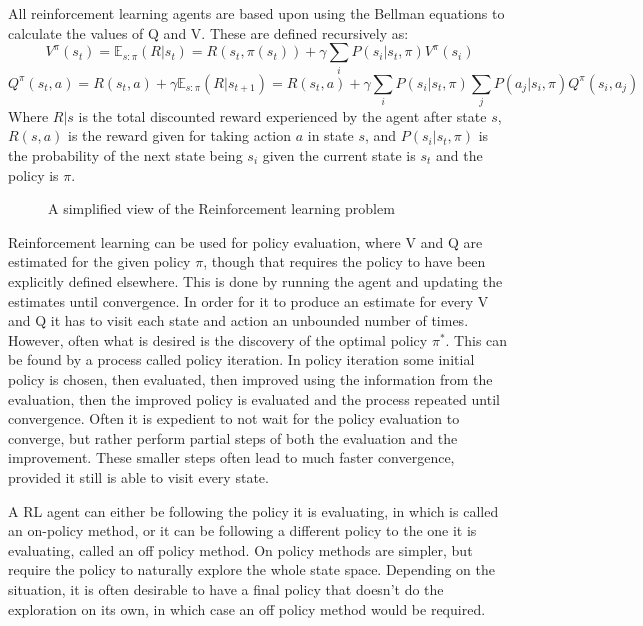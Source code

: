 All reinforcement learning agents are based upon using the Bellman equations to calculate the values of Q and V. These are defined recursively as:
\begin{equation}
V^\pi(s_t) = \mathbb{E}_{s:\pi}(R|s_t) = R(s_t,\pi(s_t)) + \gamma\sum_i P(s_i | s_t,\pi)V^\pi(s_i)
\end{equation}
\begin{equation}
Q^\pi(s_t,a) = R(s_t,a) + \gamma \mathbb{E}_{s:\pi}(R|s_{t+1}) = R(s_t,a) + \gamma \sum_i P(s_i | s_t,\pi) \sum_j P(a_j | s_i,\pi)Q^\pi(s_i,a_j)
\end{equation}
Where $R|s$ is the total discounted reward experienced by the agent after state $s$, $R(s,a)$ is the reward given for taking action $a$ in state $s$, and $P(s_i | s_t, \pi)$ is the probability of the next state being $s_i$ given the current state is $s_t$ and the policy is $\pi$.


\begin{figure}[htbp]
\centering

\caption{A simplified view of the Reinforcement learning problem}
\label{fig:rlsimple}
\end{figure}

Reinforcement learning can be used for policy evaluation, where V and Q are estimated for the given policy $\pi$, though that requires the policy to have been explicitly defined elsewhere. This is done by running the agent and updating the estimates until convergence. In order for it to produce an estimate for every V and Q it has to visit each state and action an unbounded number of times. However, often what is desired is the discovery of the optimal policy $\pi^*$. This can be found by a process called policy iteration. In policy iteration some initial policy is chosen, then evaluated, then improved using the information from the evaluation, then the improved policy is evaluated and the process repeated until convergence. Often it is expedient to not wait for the policy evaluation to converge, but rather perform partial steps of both the evaluation and the improvement. These smaller steps often lead to much faster convergence, provided it still is able to visit every state.

A RL agent can either  be following the policy it is evaluating, in which is called an on-policy method, or it can be following a different policy to the one it is evaluating, called an off policy method. On policy methods are simpler, but require the policy to naturally explore the whole state space. Depending on the situation, it is often desirable to have a final policy that doesn't do the exploration on its own, in which case an off policy method would be required.

